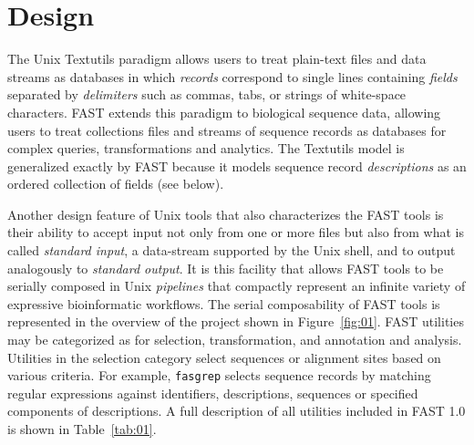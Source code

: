 \documentclass{frontiersSCNS} %
\begin{document}
\section{Design}

The Unix Textutils paradigm allows users to treat plain-text files and
data streams as databases in which {\it records} correspond to single
lines containing {\it fields} separated by {\it delimiters} such as
commas, tabs, or strings of white-space characters.  FAST extends this
paradigm to biological sequence data, allowing users to treat
collections files and streams of sequence records as databases for
complex queries, transformations and analytics. The Textutils model is
generalized exactly by FAST because it models sequence record {\it
  descriptions} as an ordered collection of fields (see below).

Another design feature of Unix tools that also characterizes the FAST
tools is their ability to accept input not only from one or more files
but also from what is called {\it standard input}, a data-stream
supported by the Unix shell, and to output analogously to {\it
  standard output}. It is this facility that allows FAST tools to be
serially composed in Unix {\it pipelines} that compactly represent an
infinite variety of expressive bioinformatic workflows. The serial
composability of FAST tools is represented in the overview of the
project shown in Figure~\ref{fig:01}.  FAST utilities may be
categorized as for selection, transformation, and annotation and
analysis. Utilities in the selection category select sequences or
alignment sites based on various criteria. For example, {\tt fasgrep}
selects sequence records by matching regular expressions against
identifiers, descriptions, sequences or specified components of
descriptions. A full description of all utilities included in FAST 1.0
is shown in Table~\ref{tab:01}.
\end{document}
